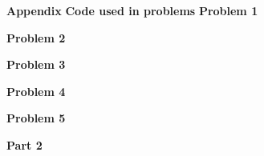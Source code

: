 \textbf{Appendix}
\textbf{Code used in problems}
\textbf{Problem 1}




\textbf{Problem 2}


\textbf{Problem 3}


\textbf{Problem 4}


\textbf{Problem 5}




\textbf{Part 2}


